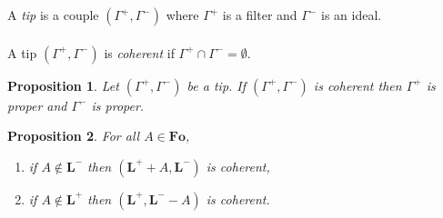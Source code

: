 \documentclass[draft]{article}
\newtheorem{proposition}{Proposition}
\newenvironment{proof}{{\bf Proof:}}{~$\dashv$\\}
\def\Formula{\mathbf{A}}
\def\Formula{\mathbf{F}}
\def\Fo{\mathbf{Fo}}
\def\L{\mathbf{L}}
\begin{document}
%
%
%
%
%
%
%
%
%
%
%
%
%
%
%
%
%
%
%
%
%
%
A {\em tip}\/ is a couple $(\Gamma^{+},\Gamma^{-})$ where $\Gamma^{+}$ is a filter and $\Gamma^{-}$ is an ideal.
%
%
\\
\\
%
%
A tip $(\Gamma^{+},\Gamma^{-})$ is {\em coherent}\/ if $\Gamma^{+}{\cap}\Gamma^{-}{=}{\emptyset}$.
%
%
\begin{proposition}\label{Proposition:let:be:a:tip:if:is:coherent:then:is:proper:and:is:proper}
%
%
Let $(\Gamma^{+},\Gamma^{-})$ be a tip.
If $(\Gamma^{+},\Gamma^{-})$ is coherent then $\Gamma^{+}$ is proper and $\Gamma^{-}$ is proper.
%
%
\end{proposition}
%
%
%
%
%
%
%
%
%
%
%
%
%
%
%
%
%
%
%
%
\begin{proposition}\label{proposition:consistent:BML:a:property:about:tips}
%
%
For all $A{\in}\Fo$,
%
%
\begin{enumerate}
%
%
\item if $A{\not\in}\L^{-}$ then $(\L^{+}{+}A,\L^{-})$ is coherent,
%
%
\item if $A{\not\in}\L^{+}$ then $(\L^{+},\L^{-}{-}A)$ is coherent.
%
%
\end{enumerate}
%
%
\end{proposition}
\end{document}
